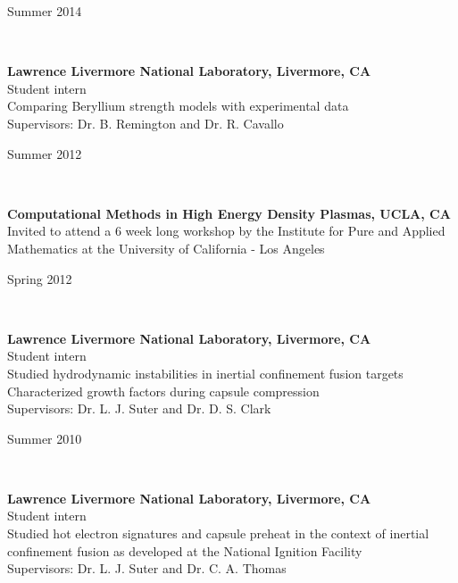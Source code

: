 \documentclass[11pt,letterpaper]{article}
\begin{document}
\begin{minipage}[t]{0.15\textwidth}\flushright%
  Summer 2014%
\end{minipage}\\[2ex]%
\begin{minipage}[t]{0.82\textwidth}%
  \textbf{Lawrence Livermore National Laboratory, Livermore, CA}\\%
  Student intern\\%
  Comparing Beryllium strength models with experimental data\\%
  Supervisors: Dr. B. Remington and Dr. R. Cavallo%
\end{minipage}\hfill%
\begin{minipage}[t]{0.15\textwidth}\flushright%
  Summer 2012%
\end{minipage}\\[2ex]%
\begin{minipage}[t]{0.82\textwidth}%
  \textbf{Computational Methods in High Energy Density Plasmas, UCLA, CA}\\%
  Invited to attend a 6 week long workshop by the Institute for Pure and Applied Mathematics at the University of California - Los Angeles%
\end{minipage}\hfill%
\begin{minipage}[t]{0.15\textwidth}\flushright%
  Spring 2012%
\end{minipage}\\[2ex]%
\begin{minipage}[t]{0.82\textwidth}%
  \textbf{Lawrence Livermore National Laboratory, Livermore, CA}\\%
  Student intern\\%
  Studied hydrodynamic instabilities in inertial confinement fusion targets\\%
  Characterized growth factors during capsule compression\\%
  Supervisors: Dr. L. J. Suter and Dr. D. S. Clark%
\end{minipage}\hfill%
\begin{minipage}[t]{0.15\textwidth}\flushright%
  Summer 2010%
\end{minipage}\\[2ex]%
\begin{minipage}[t]{0.82\textwidth}%
  \textbf{Lawrence Livermore National Laboratory, Livermore, CA}\\%
  Student intern\\%
  Studied hot electron signatures and capsule preheat in the context of inertial confinement fusion as developed at the National Ignition Facility\\%
  Supervisors:  Dr. L. J. Suter and Dr. C. A. Thomas%
\end{minipage}\hfill%
\end{document}
